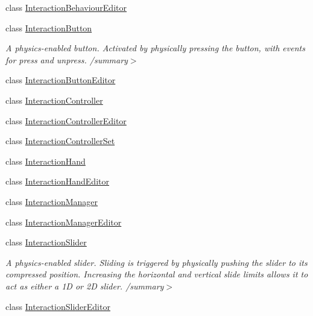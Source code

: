\begin{DoxyCompactItemize}
class \mbox{\hyperlink{class_leap_1_1_unity_1_1_interaction_1_1_interaction_behaviour_editor}{Interaction\+Behaviour\+Editor}}
\item 
class \mbox{\hyperlink{class_leap_1_1_unity_1_1_interaction_1_1_interaction_button}{Interaction\+Button}}
\begin{DoxyCompactList}\small\item\em A physics-\/enabled button. Activated by physically pressing the button, with events for press and unpress. /summary$>$ \end{DoxyCompactList}\item 
class \mbox{\hyperlink{class_leap_1_1_unity_1_1_interaction_1_1_interaction_button_editor}{Interaction\+Button\+Editor}}
\item 
class \mbox{\hyperlink{class_leap_1_1_unity_1_1_interaction_1_1_interaction_controller}{Interaction\+Controller}}
\item 
class \mbox{\hyperlink{class_leap_1_1_unity_1_1_interaction_1_1_interaction_controller_editor}{Interaction\+Controller\+Editor}}
\item 
class \mbox{\hyperlink{class_leap_1_1_unity_1_1_interaction_1_1_interaction_controller_set}{Interaction\+Controller\+Set}}
\item 
class \mbox{\hyperlink{class_leap_1_1_unity_1_1_interaction_1_1_interaction_hand}{Interaction\+Hand}}
\item 
class \mbox{\hyperlink{class_leap_1_1_unity_1_1_interaction_1_1_interaction_hand_editor}{Interaction\+Hand\+Editor}}
\item 
class \mbox{\hyperlink{class_leap_1_1_unity_1_1_interaction_1_1_interaction_manager}{Interaction\+Manager}}
\item 
class \mbox{\hyperlink{class_leap_1_1_unity_1_1_interaction_1_1_interaction_manager_editor}{Interaction\+Manager\+Editor}}
\item 
class \mbox{\hyperlink{class_leap_1_1_unity_1_1_interaction_1_1_interaction_slider}{Interaction\+Slider}}
\begin{DoxyCompactList}\small\item\em A physics-\/enabled slider. Sliding is triggered by physically pushing the slider to its compressed position. Increasing the horizontal and vertical slide limits allows it to act as either a 1D or 2D slider. /summary$>$ \end{DoxyCompactList}\item 
class \mbox{\hyperlink{class_leap_1_1_unity_1_1_interaction_1_1_interaction_slider_editor}{Interaction\+Slider\+Editor}}

\end{DoxyCompactItemize}
